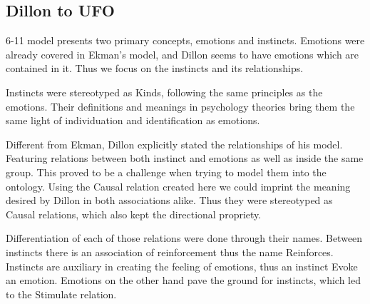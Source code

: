 \subsection{Dillon to UFO}
6-11 model presents two primary concepts, emotions and instincts. Emotions were already covered in Ekman's model, and Dillon seems to have emotions which are contained in it. Thus we focus on the instincts and its relationships.

Instincts were stereotyped as Kinds, following the same principles as the emotions. Their definitions and meanings in psychology theories bring them the same light of individuation and identification as emotions.

Different from Ekman, Dillon explicitly stated the relationships of his model. Featuring relations between both instinct and emotions as well as inside the same group. This proved to be a challenge when trying to model them into the ontology. Using the Causal relation created here we could imprint the meaning desired by Dillon in both associations alike. Thus they were stereotyped as Causal relations, which also kept the directional propriety.

Differentiation of each of those relations were done through their names. Between instincts there is an association of reinforcement thus the name Reinforces. Instincts are auxiliary in creating the feeling of emotions, thus an instinct Evoke an emotion. Emotions on the other hand pave the ground for instincts, which led to the Stimulate relation.